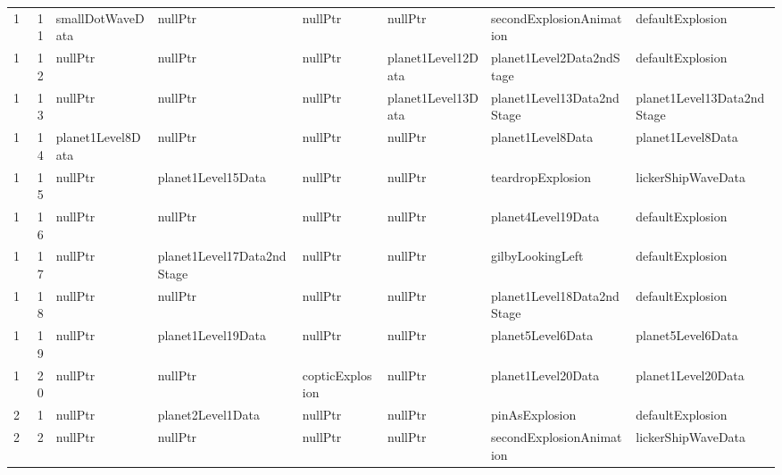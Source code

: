 \begin{tabular}{rrllllll}
      1 &      11 & smallDotWaveData         & nullPtr                      & nullPtr                      & nullPtr                   & secondExplosionAnimation   & defaultExplosion           \\
      1 &      12 & nullPtr                  & nullPtr                      & nullPtr                      & planet1Level12Data        & planet1Level2Data2ndStage  & defaultExplosion           \\
      1 &      13 & nullPtr                  & nullPtr                      & nullPtr                      & planet1Level13Data        & planet1Level13Data2ndStage & planet1Level13Data2ndStage \\
      1 &      14 & planet1Level8Data        & nullPtr                      & nullPtr                      & nullPtr                   & planet1Level8Data          & planet1Level8Data          \\
      1 &      15 & nullPtr                  & planet1Level15Data           & nullPtr                      & nullPtr                   & teardropExplosion          & lickerShipWaveData         \\
      1 &      16 & nullPtr                  & nullPtr                      & nullPtr                      & nullPtr                   & planet4Level19Data         & defaultExplosion           \\
      1 &      17 & nullPtr                  & planet1Level17Data2ndStage   & nullPtr                      & nullPtr                   & gilbyLookingLeft           & defaultExplosion           \\
      1 &      18 & nullPtr                  & nullPtr                      & nullPtr                      & nullPtr                   & planet1Level18Data2ndStage & defaultExplosion           \\
      1 &      19 & nullPtr                  & planet1Level19Data           & nullPtr                      & nullPtr                   & planet5Level6Data          & planet5Level6Data          \\
      1 &      20 & nullPtr                  & nullPtr                      & copticExplosion              & nullPtr                   & planet1Level20Data         & planet1Level20Data         \\
      2 &       1 & nullPtr                  & planet2Level1Data            & nullPtr                      & nullPtr                   & pinAsExplosion             & defaultExplosion           \\
      2 &       2 & nullPtr                  & nullPtr                      & nullPtr                      & nullPtr                   & secondExplosionAnimation   & lickerShipWaveData         \\

\end{tabular}
